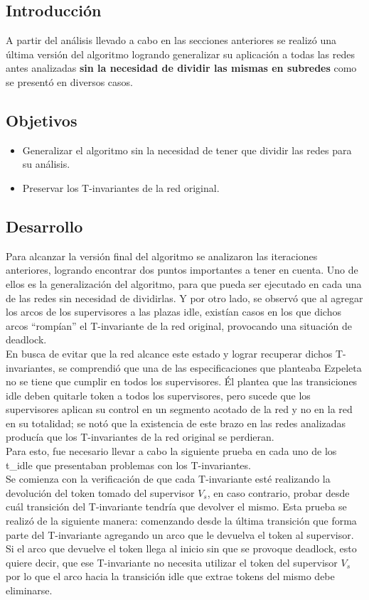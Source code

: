 \subsection{Introducción}
A partir del análisis llevado a cabo en las secciones anteriores se realizó una última versión del algoritmo logrando generalizar su aplicación a todas las redes antes analizadas \textbf{sin la necesidad de dividir las mismas en subredes} como se presentó en diversos casos.

\subsection{Objetivos}
\begin{itemize}
    \item Generalizar el algoritmo sin la necesidad de tener que dividir las redes para su análisis.
    \item Preservar los T-invariantes de la red original.
\end{itemize}

\subsection{Desarrollo}
Para alcanzar la versión final del algoritmo se analizaron las iteraciones anteriores, logrando encontrar dos puntos importantes a tener en cuenta. Uno de ellos es la generalización del algoritmo, para que pueda ser ejecutado en cada una de las redes sin necesidad de dividirlas. Y por otro lado, se observó que al agregar los arcos de los supervisores a las plazas idle, existían casos en los que dichos arcos “rompían” el T-invariante de la red original, provocando una situación de deadlock. \\
En busca de evitar que la red alcance este estado y lograr recuperar dichos \break T-invariantes, se comprendió que una de las especificaciones que planteaba Ezpeleta no se tiene que cumplir en todos los supervisores. Él plantea que las transiciones idle deben quitarle token a todos los supervisores, pero sucede que los supervisores aplican su control en un segmento acotado de la red y no en la red en su totalidad; se notó que la existencia de este brazo en las redes analizadas producía que los \break T-invariantes de la red original se perdieran. \\ 
Para esto, fue necesario llevar a cabo la siguiente prueba en cada uno de los t\_idle que presentaban problemas con los T-invariantes. \\
Se comienza con la verificación de que cada T-invariante esté realizando la devolución del token tomado del supervisor $V_s$, en caso contrario, probar desde cuál transición del T-invariante tendría que devolver el mismo. Esta prueba se realizó de la siguiente manera: comenzando desde la última transición que forma parte del \break T-invariante agregando un arco que le devuelva el token al supervisor. Si el arco  que devuelve el token llega al inicio sin que se provoque deadlock, esto quiere decir, que ese T-invariante no necesita utilizar el token del supervisor $V_s$ por lo que el arco hacia la transición idle que extrae tokens del mismo debe eliminarse.

